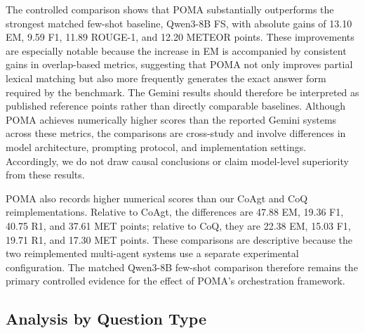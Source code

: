 \documentclass[]{interact}
\begin{document}
The controlled comparison shows that POMA substantially outperforms the strongest matched few-shot baseline, Qwen3-8B FS, with absolute gains of 13.10 EM, 9.59 F1, 11.89 ROUGE-1, and 12.20 METEOR points. These improvements are especially notable because the increase in EM is accompanied by consistent gains in overlap-based metrics, suggesting that POMA not only improves partial lexical matching but also more frequently generates the exact answer form required by the benchmark. The Gemini results should therefore be interpreted as published reference points rather than directly comparable baselines. Although POMA achieves numerically higher scores than the reported Gemini systems across these metrics, the comparisons are cross-study and involve differences in model architecture, prompting protocol, and implementation settings. Accordingly, we do not draw causal conclusions or claim model-level superiority from these results.

POMA also records higher numerical scores than our CoAgt and CoQ reimplementations. Relative to CoAgt, the differences are 47.88 EM, 19.36 F1, 40.75 R1, and 37.61 MET points; relative to CoQ, they are 22.38 EM, 15.03 F1, 19.71 R1, and 17.30 MET points. These comparisons are descriptive because the two reimplemented multi-agent systems use a separate experimental configuration. The matched Qwen3-8B few-shot comparison therefore remains the primary controlled evidence for the effect of POMA's orchestration framework.

\subsection{Analysis by Question Type}
\end{document}

